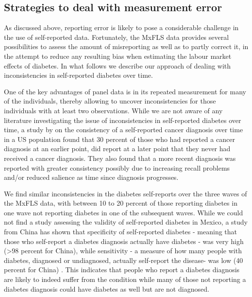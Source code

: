 
\providecommand{\tabularnewline}{\\}

\subsection{Strategies to deal with measurement error}

As discussed above, reporting error is likely to pose a considerable
challenge in the use of self-reported data. Fortunately, the \ac{MxFLS}
data provides several possibilities to assess the amount of misreporting
as well as to partly correct it, in the attempt to reduce any resulting
bias when estimating the labour market effects of diabetes. In what
follows we describe our approach of dealing with inconsistencies in
self-reported diabetes over time.

One of the key advantages of panel data is in its repeated measurement
for many of the individuals, thereby allowing to uncover inconsistencies
for those individuals with at least two observations. While we are
not aware of any literature investigating the issue of inconsistencies
in self-reported diabetes over time, a study by \citet{Zajacova2010}
on the consistency of a self-reported cancer diagnosis over time in
a US population found that 30 percent of those who had reported a
cancer diagnosis at an earlier point, did report at a later point
that they never had received a cancer diagnosis. They also found that
a more recent diagnosis was reported with greater consistency possibly
due to increasing recall problems and/or reduced salience as time
since diagnosis progresses.

We find similar inconsistencies in the diabetes self-reports over
the three waves of the \ac{MxFLS} data, with between 10 to 20 percent
of those reporting diabetes in one wave not reporting diabetes in
one of the subsequent waves. While we could not find a study assessing
the validity of self-reported diabetes in Mexico, a study from China
has shown that specificity of self-reported diabetes - meaning that
those who self-report a diabetes diagnosis actually have diabetes
- was very high (>98 percent for China), while sensitivity - a measure
of how many people with diabetes, diagnosed or undiagnosed, actually
self-report the disease- was low (40 percent for China) \citep{Yuan2015a}.
This indicates that people who report a diabetes diagnosis are likely
to indeed suffer from the condition while many of those not reporting
a diabetes diagnosis could have diabetes as well but are not diagnosed.

